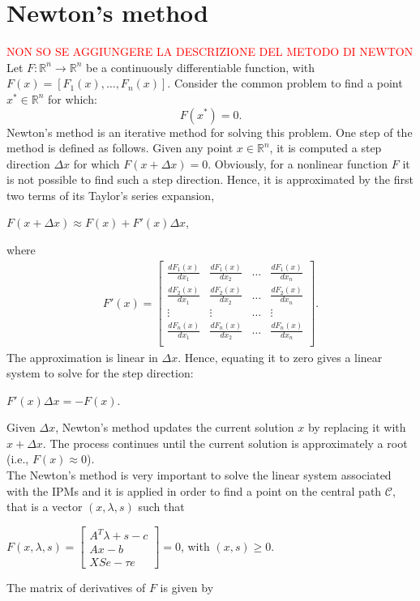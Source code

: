 \documentclass[a4paper,10 pt,titlepage,twoside]{book}
\theoremstyle{plain}
\theoremstyle{definition}
\theoremstyle{remark}
\begin{document}
	\section*{Newton's method}
	\textcolor{red}{NON SO SE AGGIUNGERE LA DESCRIZIONE DEL METODO DI NEWTON}\\
	Let $F \colon \mathbb{R}^{n} \to \mathbb{R}^{n}$ be a continuously differentiable function, with $F(x) = [F_{1}(x),\dots,F_{n}(x)] $. Consider the common problem to find a point $x^{*}\in\mathbb{R}^{n}$ for which:
\begin{equation*}
F(x^{*})=0.
\end{equation*}
Newton's method is an iterative method for solving this problem. One step of the method is defined as follows. Given any point $x\in\mathbb{R}^{n}$, it is computed a step direction $\Delta x$ for which $F(x + \Delta x)=0$. Obviously, for a nonlinear function $F$ it is not possible to find such a step direction. Hence, it is approximated by the first two terms of its Taylor's series expansion,
\begin{center}
	$F(x+\Delta x)\approx F(x) + F'(x)\Delta x$,
\end{center}
where
\begin{align*}
F'(x)= \begin{bmatrix}\frac{dF_{1}(x)}{dx_{1}}&\frac{dF_{1}(x)}{dx_{2}}&\dots&\frac{dF_{1}(x)}{dx_{n}}\\
\frac{dF_{2}(x)}{dx_{1}}&\frac{dF_{2}(x)}{dx_{2}}&\dots&\frac{dF_{2}(x)}{dx_{n}}\\
\vdots&\vdots&\dots&\vdots\\
\frac{dF_{n}(x)}{dx_{1}}&\frac{dF_{n}(x)}{dx_{2}}&\dots&\frac{dF_{n}(x)}{dx_{n}}\\
\end{bmatrix}.
\end{align*}
The approximation is linear in $\Delta x$. Hence, equating it to zero gives a linear system to solve for the step direction:
\begin{center}
	$F'(x)\Delta x = -F(x)$.
\end{center}
Given $\Delta x$, Newton's method updates the current solution $x$ by replacing it with $x+\Delta x$. The process continues until the current solution is approximately a root (i.e., $F(x)\approx0$). \\
The Newton’s method is very important to solve the linear system associated with the IPMs and it is applied in order to find a point on the central path $\mathcal{C}$, that is a vector $(x,\lambda, s)$ such that
 \begin{center}
	$\mathit{F}(x,\lambda,s)= \begin{bmatrix}
	A^{T}\lambda+s-c \\Ax-b \\XSe-\tau e
	\end{bmatrix}=0$, with $(x,s)\geq0$.
\end{center}The matrix of derivatives of $F$ is given by
\end{document}
